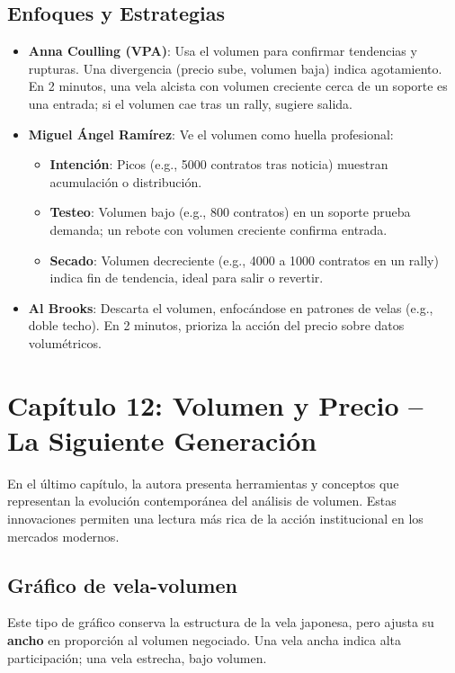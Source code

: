 \subsection{Enfoques y Estrategias}
\begin{itemize}
    \item \textbf{Anna Coulling (VPA)}: Usa el volumen para confirmar tendencias y rupturas. Una divergencia (precio sube, volumen baja) indica agotamiento. En 2 minutos, una vela alcista con volumen creciente cerca de un soporte es una entrada; si el volumen cae tras un rally, sugiere salida.
    \item \textbf{Miguel \'Angel Ram\'irez}: Ve el volumen como huella profesional:
    \begin{itemize}
        \item \textbf{Intenci\'on}: Picos (e.g., 5000 contratos tras noticia) muestran acumulaci\'on o distribuci\'on.
        \item \textbf{Testeo}: Volumen bajo (e.g., 800 contratos) en un soporte prueba demanda; un rebote con volumen creciente confirma entrada.
        \item \textbf{Secado}: Volumen decreciente (e.g., 4000 a 1000 contratos en un rally) indica fin de tendencia, ideal para salir o revertir.
    \end{itemize}
    \item \textbf{Al Brooks}: Descarta el volumen, enfoc\'andose en patrones de velas (e.g., doble techo). En 2 minutos, prioriza la acci\'on del precio sobre datos volum\'etricos.
\end{itemize}


\section{Cap\'itulo 12: Volumen y Precio -- La Siguiente Generaci\'on}

En el \'ultimo cap\'itulo, la autora presenta herramientas y conceptos que representan la evoluci\'on contempor\'anea del an\'alisis de volumen. Estas innovaciones permiten una lectura m\'as rica de la acci\'on institucional en los mercados modernos.

\subsection{Gr\'afico de vela-volumen}

Este tipo de gr\'afico conserva la estructura de la vela japonesa, pero ajusta su \textbf{ancho} en proporci\'on al volumen negociado. Una vela ancha indica alta participaci\'on; una vela estrecha, bajo volumen.

